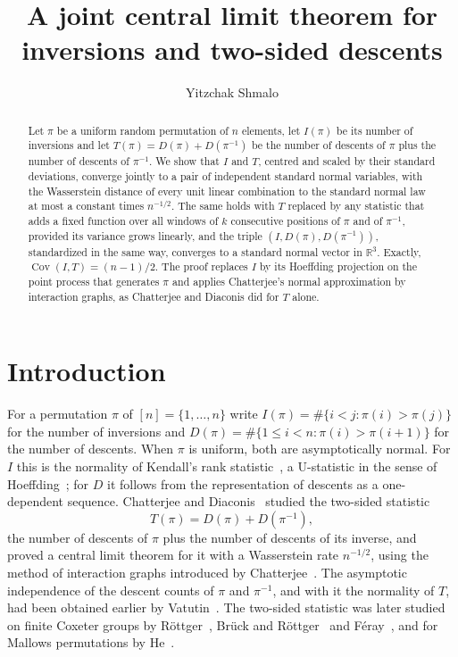 \documentclass[11pt]{amsart}
\theoremstyle{remark}
\newcommand{\Cov}{\operatorname{Cov}}
\begin{document}
\title[Inversions and two-sided descents]{A joint central limit theorem for inversions and two-sided descents}
\author{Yitzchak Shmalo}
\address{Einstein Institute of Mathematics, The Hebrew University of Jerusalem, Jerusalem, Israel}

\begin{abstract}
Let $\pi$ be a uniform random permutation of $n$ elements, let $I(\pi)$ be its number of inversions and let
$T(\pi)=D(\pi)+D(\pi^{-1})$ be the number of descents of $\pi$ plus the number of descents of $\pi^{-1}$. We show that
$I$ and $T$, centred and scaled by their standard deviations, converge jointly to a pair of independent standard normal
variables, with the Wasserstein distance of every unit linear combination to the standard normal law at most a constant
times $n^{-1/2}$. The same holds with $T$ replaced by any statistic that adds a fixed function over all windows of $k$
consecutive positions of $\pi$ and of $\pi^{-1}$, provided its variance grows linearly, and the triple
$(I,D(\pi),D(\pi^{-1}))$, standardized in the same way, converges to a standard normal vector in $\mathbb R^3$. Exactly,
$\Cov(I,T)=(n-1)/2$. The proof replaces $I$ by its Hoeffding projection on the point process that generates $\pi$
and applies Chatterjee's normal approximation by interaction graphs, as Chatterjee and Diaconis did for $T$ alone.
\end{abstract}

\maketitle

\section{Introduction}\label{sec:intro}

For a permutation $\pi$ of $[n]=\{1,\dots,n\}$ write $I(\pi)=\#\{i<j:\pi(i)>\pi(j)\}$ for the number of inversions
and $D(\pi)=\#\{1\le i<n:\pi(i)>\pi(i+1)\}$ for the number of descents. When $\pi$ is uniform, both are
asymptotically normal. For $I$ this is the normality of Kendall's rank statistic~\cite{Kendall}, a U-statistic in the
sense of Hoeffding~\cite{Hoeffding}; for $D$ it follows from the representation of descents as a one-dependent
sequence. Chatterjee and Diaconis~\cite{CD} studied the two-sided statistic
\[
T(\pi)=D(\pi)+D(\pi^{-1}),
\]
the number of descents of $\pi$ plus the number of descents of its inverse, and proved a central limit theorem for
it with a Wasserstein rate $n^{-1/2}$, using the method of interaction graphs introduced by Chatterjee~\cite{Ch08}.
The asymptotic independence of the descent counts of $\pi$ and $\pi^{-1}$, and with it the normality of $T$, had been
obtained earlier by Vatutin~\cite{Vatutin}. The two-sided statistic was later studied on finite Coxeter groups by
Röttger~\cite{Rottger}, Brück and Röttger~\cite{BruckRottger} and Féray~\cite{FerayCoxeter}, and for Mallows
permutations by He~\cite{He}.
\end{document}
